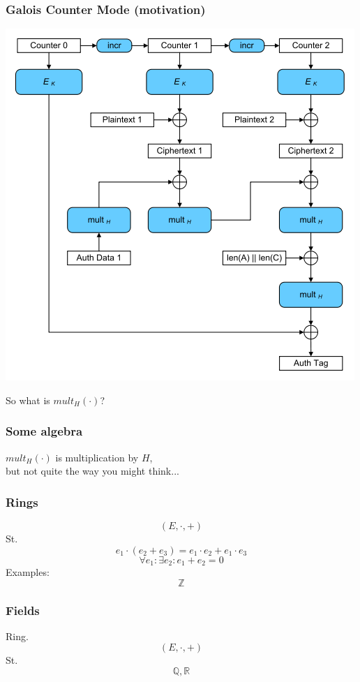 \documentclass{beamer}
\begin{document}
\begin{frame}
\frametitle{Galois Counter Mode (motivation)}
\begin{center}
\includegraphics[height=0.7\textheight]{mode-gcm.png}
\end{center}
So what is $mult_{H}(\cdot)$?
\end{frame}

\begin{frame}
\frametitle{Some algebra}
\begin{center}
$mult_{H}(\cdot)$ is multiplication by $H$, \\
but not quite the way you might think...
\end{center}
\end{frame}

\begin{frame}
\frametitle{Rings}
\[
    (E, \cdot, +)
\]
St.
\[
    e_{1} \cdot (e_{2} + e_{3})
    =
    e_{1} \cdot e_{2}
    +
    e_{1} \cdot e_{3}
\]
\[
    \forall e_{1} :
    \exists e_{2} :
    e_{1} + e_{2} = 0
\]
Examples:
\[
    \mathbb{Z}
\]
\end{frame}

\begin{frame}
\frametitle{Fields}
Ring.
\[
    (E, \cdot, +)
\]
St.
\[
    \mathbb{Q}, \mathbb{R}
\]
\end{frame}
\end{document}
